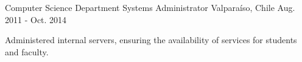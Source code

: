 \begin{cventries}
  \cventry
    {Computer Science Department}
    {Systems Administrator}
    {Valparaíso, Chile}
    {Aug. 2011 - Oct. 2014}
    {
      \begin{cvitems}
    \item{Administered internal servers, ensuring the availability of services for students and faculty.}

      \end{cvitems}
    }
\end{cventries}
